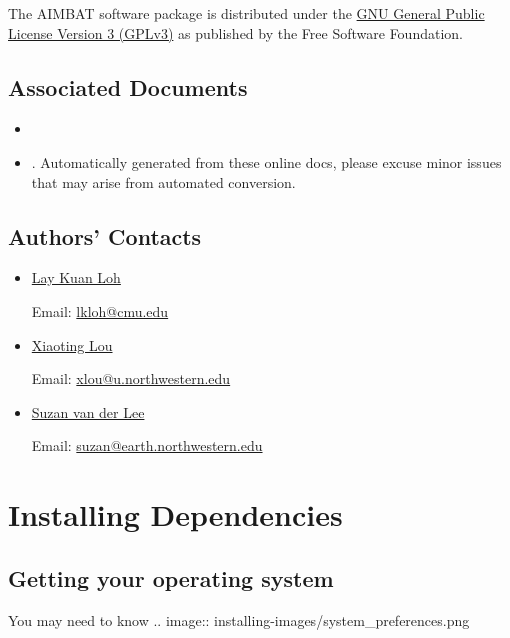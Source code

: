 \documentclass[letterpaper,10pt,english]{sphinxmanual}
\begin{document}
The AIMBAT software package is distributed under the \href{http://www.gnu.org/licenses/gpl.html}{GNU General Public License Version 3 (GPLv3)} as published by the Free Software Foundation.


\section{Associated Documents}
\label{docfiles/introduction:associated-documents}\begin{itemize}
\item {} 

\item {} 
. Automatically generated from these online docs, please excuse minor issues that may arise from automated conversion.

\end{itemize}


\section{Authors' Contacts}
\label{docfiles/introduction:authors-contacts}\label{docfiles/introduction:id5}\begin{itemize}
\item {} 
\href{http://lkloh2410.wordpress.com/}{Lay Kuan Loh}

Email: \href{mailto:lkloh@cmu.edu}{lkloh@cmu.edu}

\item {} 
\href{http://www.earth.northwestern.edu/~xlou/Welcome.html}{Xiaoting Lou}

Email: \href{mailto:xlou@u.northwestern.edu}{xlou@u.northwestern.edu}

\item {} 
\href{http://www.earth.northwestern.edu/research/suzan/}{Suzan van der Lee}

Email: \href{mailto:suzan@earth.northwestern.edu}{suzan@earth.northwestern.edu}

\end{itemize}


\chapter{Installing Dependencies}
\label{docfiles/install_dependencies:installing-dependencies}\label{docfiles/install_dependencies::doc}

\section{Getting your operating system}
\label{docfiles/install_dependencies:getting-your-operating-system}
You may need to know
.. image:: installing-images/system\_preferences.png
\end{document}
